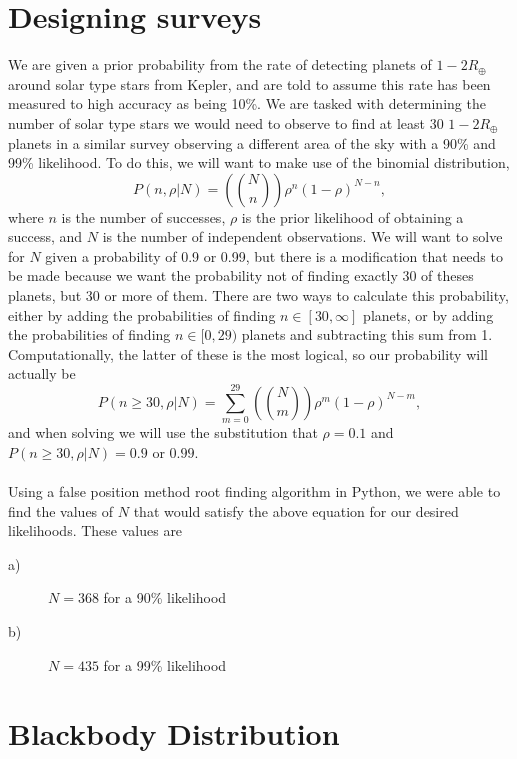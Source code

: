 \documentclass[12pt,a4paper]{article}
\begin{document}
\section{Designing surveys}
We are given a prior probability from the rate of detecting planets of $1-2 R_{\oplus}$ around solar type stars from Kepler, and are told to assume this rate has been measured to high accuracy as being 10\%. We are tasked with determining the number of solar type stars we would need to observe to find at least 30 $1-2 R_{\oplus}$ planets in a similar survey observing a different area of the sky with a 90\% and 99\% likelihood. To do this, we will want to make use of the binomial distribution,
\begin{equation*}
  P(n, \rho | N) = \left(N \choose n\right) \rho^n \left(1 - \rho\right)^{N - n},
\end{equation*}
where $n$ is the number of successes, $\rho$ is the prior likelihood of obtaining a success, and $N$ is the number of independent observations. We will want to solve for $N$ given a probability of 0.9 or 0.99, but there is a modification that needs to be made because we want the probability not of finding exactly 30 of theses planets, but 30 or more of them. There are two ways to calculate this probability, either by adding the probabilities of finding $n \in {[30, \infty]}$ planets, or by adding the probabilities of finding $n \in {[0, 29)}$ planets and subtracting this sum from 1. Computationally, the latter of these is the most logical, so our probability will actually be
  \begin{equation*}
    P(n \ge 30, \rho | N) = \sum_{m = 0}^{29} \left(N \choose m\right) \rho^m \left(1 - \rho\right)^{N - m},
  \end{equation*}
  and when solving we will use the substitution that $\rho = 0.1$ and $P(n \ge 30, \rho | N) = 0.9$ or $0.99$.\\\\
Using a false position method root finding algorithm in Python, we were able to find the values of $N$ that would satisfy the above equation for our desired likelihoods. These values are
\begin{description}
  \item [\normalfont a)]$N = 368$ for a 90\% likelihood
  \item [\normalfont b)]$N = 435$ for a 99\% likelihood
\end{description}

\section{Blackbody Distribution}
\end{document}
